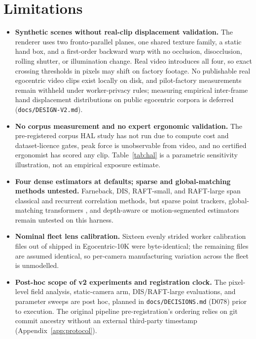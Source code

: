 \documentclass[11pt]{article}
\begin{document}
\section{Limitations}
\label{sec:limits}

\begin{itemize}\setlength\itemsep{2pt}\setlength\parskip{0pt}
\item \textbf{Synthetic scenes without real-clip displacement validation.} The renderer uses two
fronto-parallel planes, one shared texture family, a static hand box, and a first-order backward
warp with no occlusion, disocclusion, rolling shutter, or illumination change. Real video introduces
all four, so exact crossing thresholds in pixels may shift on factory footage. No publishable real
egocentric video clips exist locally on disk, and pilot-factory measurements remain withheld under
worker-privacy rules; measuring empirical inter-frame hand displacement distributions on public
egocentric corpora is deferred (\texttt{docs/DESIGN-V2.md}).
\item \textbf{No corpus measurement and no expert ergonomic validation.} The pre-registered corpus
HAL study has not run due to compute cost and dataset-licence gates, peak force is unobservable
from video, and no certified ergonomist has scored any clip. Table~\ref{tab:hal} is a parametric
sensitivity illustration, not an empirical exposure estimate.
\item \textbf{Four dense estimators at defaults; sparse and global-matching methods untested.}
Farneback, DIS, RAFT-small, and RAFT-large span classical and recurrent correlation methods, but
sparse point trackers, global-matching transformers \citep{xu2022gmflow}, and depth-aware or
motion-segmented estimators remain untested on this harness.
\item \textbf{Nominal fleet lens calibration.} Sixteen evenly strided worker calibration files out
of \cgLensShipped{} shipped in Egocentric-10K were byte-identical; the remaining files are assumed
identical, so per-camera manufacturing variation across the fleet is unmodelled.
\item \textbf{Post-hoc scope of v2 experiments and registration clock.} The pixel-level field
analysis, static-camera arm, DIS/RAFT-large evaluations, and parameter sweeps are post hoc, planned
in \texttt{docs/DECISIONS.md} (D078) prior to execution. The original pipeline pre-registration's
ordering relies on git commit ancestry without an external third-party timestamp
(Appendix~\ref{app:protocol}).
\end{itemize}
\end{document}
